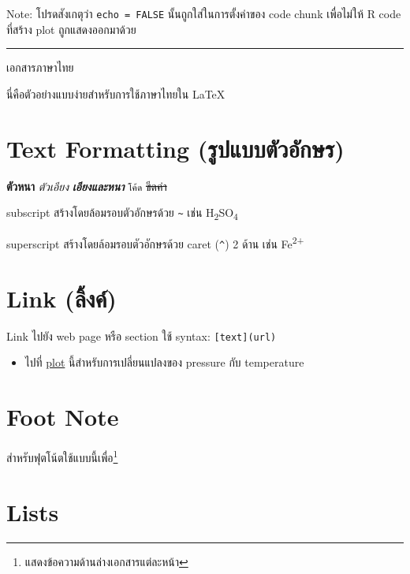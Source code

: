 \documentclass[
]{article}\usepackage{amsmath,amssymb}
\providecommand{\tightlist}{%
  \setlength{\itemsep}{0pt}\setlength{\parskip}{0pt}}\usepackage{longtable,booktabs,array}
\begin{document}
Note: โปรดสังเกตุว่า \texttt{echo\ =\ FALSE} นั้นถูกใส่ในการตั้งค่าของ code chunk
เพื่อไม่ให้ R code ที่สร้าง plot ถูกแสดงออกมาด้วย

\begin{center}\rule{0.5\linewidth}{0.5pt}\end{center}

เอกสารภาษาไทย

นี่คือตัวอย่างแบบง่ายสำหรับการใช้ภาษาไทยใน \LaTeX

\hypertarget{text-formatting-uxe23uxe1buxe41uxe1auxe1auxe15uxe27uxe2duxe01uxe29uxe23}{%
\section{Text Formatting
(รูปแบบตัวอักษร)}\label{text-formatting-uxe23uxe1buxe41uxe1auxe1auxe15uxe27uxe2duxe01uxe29uxe23}}

\textbf{ตัวหนา} \emph{ตัวเอียง} \textbf{\emph{เอียงและหนา}} \texttt{โค้ด}
\sout{ขีดค่า}

subscript สร้างโดยล้อมรอบตัวอักษรด้วย \texttt{\textasciitilde{}} เช่น
H\textsubscript{2}SO\textsubscript{4}

superscript สร้างโดยล้อมรอบตัวอักษรด้วย caret (\texttt{\^{}}) 2 ด้าน เช่น
Fe\textsuperscript{2+}

\hypertarget{link-uxe25uxe07uxe04}{%
\section{Link (ลิ้งค์)}\label{link-uxe25uxe07uxe04}}

Link ไปยัง web page หรือ section ใช้ syntax: \texttt{{[}text{]}(url)}

\begin{itemize}
\tightlist
\item
  ไปที่ \protect\hyperlink{plot}{plot} นี้สำหรับการเปลี่ยนแปลงของ pressure กับ
  temperature
\end{itemize}

\hypertarget{foot-note}{%
\section{Foot Note}\label{foot-note}}

สำหรับฟุตโน้ตใช้แบบนี้เพื่อ\footnote{แสดงข้อความด้านล่างเอกสารแต่ละหน้า}

\hypertarget{lists}{%
\section{Lists}\label{lists}}
\end{document}
